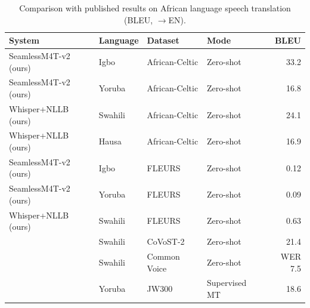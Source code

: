 
\begin{table}[t]
\centering
\small
\setlength{\tabcolsep}{4pt}
\caption{Comparison with published results on African language speech translation (BLEU, $\to$EN).}
\label{tab:sota}
\begin{tabular}{llllr}
\toprule
\textbf{System} & \textbf{Language} & \textbf{Dataset} & \textbf{Mode} & \textbf{BLEU} \\
\midrule
SeamlessM4T-v2 (ours) & Igbo    & African-Celtic & Zero-shot & 33.2 \\
SeamlessM4T-v2 (ours) & Yoruba  & African-Celtic & Zero-shot & 16.8 \\
Whisper+NLLB (ours)   & Swahili & African-Celtic & Zero-shot & 24.1 \\
Whisper+NLLB (ours)   & Hausa   & African-Celtic & Zero-shot & 16.9 \\
\midrule
SeamlessM4T-v2 (ours) & Igbo    & FLEURS & Zero-shot & 0.12 \\
SeamlessM4T-v2 (ours) & Yoruba  & FLEURS & Zero-shot & 0.09 \\
Whisper+NLLB (ours)   & Swahili & FLEURS & Zero-shot & 0.63 \\
\midrule
\citet{barrault2023seamlessm4t} & Swahili & CoVoST-2 & Zero-shot & 21.4 \\
\citet{radford2023whisper}      & Swahili & Common Voice & Zero-shot & WER 7.5 \\
\citet{nekoto2020participatory} & Yoruba  & JW300 & Supervised MT & 18.6 \\
\bottomrule
\end{tabular}
\end{table}

